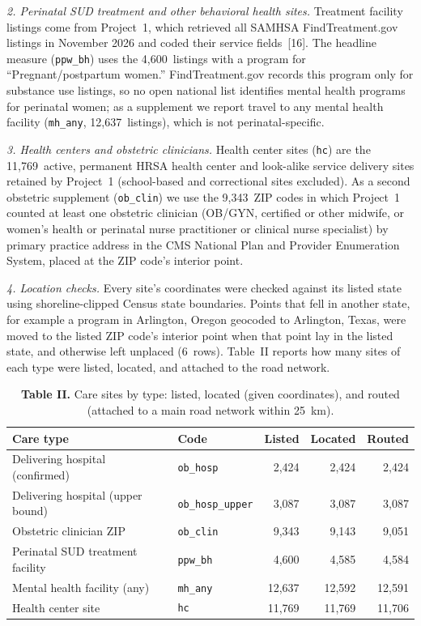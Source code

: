 \documentclass{article}
\begin{document}
\textit{2. Perinatal SUD treatment and other behavioral health sites.} 
Treatment facility listings come from Project~1, which retrieved all SAMHSA FindTreatment.gov listings in November 2026 and coded their service fields~[16]. The headline measure (\texttt{ppw\_bh}) uses the 4,600\ listings with a program for ``Pregnant/postpartum women.'' FindTreatment.gov records this program only for substance use listings, so no open national list identifies mental health programs for perinatal women; as a supplement we report travel to any mental health facility (\texttt{mh\_any}, 12,637\ listings), which is not perinatal-specific.

\textit{3. Health centers and obstetric clinicians.} 
Health center sites (\texttt{hc}) are the 11,769\ active, permanent HRSA health center and look-alike service delivery sites retained by Project~1 (school-based and correctional sites excluded). As a second obstetric supplement (\texttt{ob\_clin}) we use the 9,343\ ZIP codes in which Project~1 counted at least one obstetric clinician (OB/GYN, certified or other midwife, or women's health or perinatal nurse practitioner or clinical nurse specialist) by primary practice address in the CMS National Plan and Provider Enumeration System, placed at the ZIP code's interior point.

\textit{4. Location checks.} 
Every site's coordinates were checked against its listed state using shoreline-clipped Census state boundaries. Points that fell in another state, for example a program in Arlington, Oregon geocoded to Arlington, Texas, were moved to the listed ZIP code's interior point when that point lay in the listed state, and otherwise left unplaced (6\ rows). Table~II reports how many sites of each type were listed, located, and attached to the road network.

\begin{table}
\centering\caption{\textbf{Table II.} Care sites by type: listed, located (given coordinates), and routed (attached to a main road network within 25~km).}
\begin{tabular}{@{}llrrr@{}}
\toprule
Care type & Code & Listed & Located & Routed \\
\midrule
Delivering hospital (confirmed) & \texttt{ob\_hosp} & 2,424 & 2,424 & 2,424 \\
Delivering hospital (upper bound) & \texttt{ob\_hosp\_upper} & 3,087 & 3,087 & 3,087 \\
Obstetric clinician ZIP & \texttt{ob\_clin} & 9,343 & 9,143 & 9,051 \\
Perinatal SUD treatment facility & \texttt{ppw\_bh} & 4,600 & 4,585 & 4,584 \\
Mental health facility (any) & \texttt{mh\_any} & 12,637 & 12,592 & 12,591 \\
Health center site & \texttt{hc} & 11,769 & 11,769 & 11,706 \\
\bottomrule
\end{tabular}

\end{table}
\end{document}
